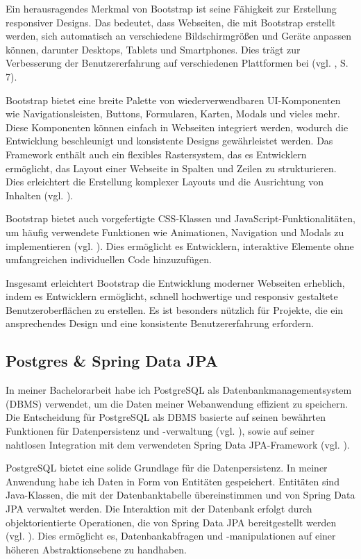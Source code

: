 \documentclass[fontsize=12pt,openright,oneside,paper=a4,BCOR=1cm]{scrbook}
\begin{document}
Ein herausragendes Merkmal von Bootstrap ist seine Fähigkeit zur Erstellung responsiver Designs. Das bedeutet, dass Webseiten, die mit Bootstrap erstellt werden, sich automatisch an verschiedene Bildschirmgrößen und Geräte anpassen können, darunter Desktops, Tablets und Smartphones. Dies trägt zur Verbesserung der Benutzererfahrung auf verschiedenen Plattformen bei (vgl. \cite{spurlock2013bootstrap}, S. 7).

Bootstrap bietet eine breite Palette von wiederverwendbaren UI-Komponenten wie Navigationsleisten, Buttons, Formularen, Karten, Modals und vieles mehr. Diese Komponenten können einfach in Webseiten integriert werden, wodurch die Entwicklung beschleunigt und konsistente Designs gewährleistet werden.
Das Framework enthält auch ein flexibles Rastersystem, das es Entwicklern ermöglicht, das Layout einer Webseite in Spalten und Zeilen zu strukturieren. Dies erleichtert die Erstellung komplexer Layouts und die Ausrichtung von Inhalten (vgl. \cite{bootstrapgrid}).

Bootstrap bietet auch vorgefertigte CSS-Klassen und JavaScript-Funktionalitäten, um häufig verwendete Funktionen wie Animationen, Navigation und Modals zu implementieren (vgl. \cite{bootstrapjs}). Dies ermöglicht es Entwicklern, interaktive Elemente ohne umfangreichen individuellen Code hinzuzufügen.

Insgesamt erleichtert Bootstrap die Entwicklung moderner Webseiten erheblich, indem es Entwicklern ermöglicht, schnell hochwertige und responsiv gestaltete Benutzeroberflächen zu erstellen. Es ist besonders nützlich für Projekte, die ein ansprechendes Design und eine konsistente Benutzererfahrung erfordern.

\subsection{Postgres \& Spring Data JPA}

In meiner Bachelorarbeit habe ich PostgreSQL als Datenbankmanagementsystem (DBMS) verwendet, um die Daten meiner Webanwendung effizient zu speichern. Die Entscheidung für PostgreSQL als DBMS basierte auf seinen bewährten Funktionen für Datenpersistenz und -verwaltung (vgl. \cite{postgres}), sowie auf seiner nahtlosen Integration mit dem verwendeten Spring Data JPA-Framework (vgl. \cite{springdatajpa}).

PostgreSQL bietet eine solide Grundlage für die Datenpersistenz. In meiner Anwendung habe ich Daten in Form von Entitäten gespeichert. Entitäten sind Java-Klassen, die mit der Datenbanktabelle übereinstimmen und von Spring Data JPA verwaltet werden. Die Interaktion mit der Datenbank erfolgt durch objektorientierte Operationen, die von Spring Data JPA bereitgestellt werden (vgl. \cite{springdatajpaentities}). Dies ermöglicht es, Datenbankabfragen und -manipulationen auf einer höheren Abstraktionsebene zu handhaben.
\end{document}
